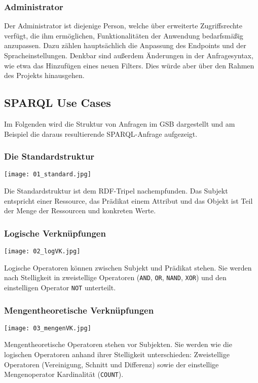 \subsubsection{Administrator}

Der Administrator ist diejenige Person, welche über erweiterte Zugriffsrechte verfügt, die ihm ermöglichen, Funktionalitäten der Anwendung bedarfsmäßig anzupassen.
Dazu zählen hauptsächlich die Anpassung des Endpoints und der Spracheinstellungen. Denkbar sind außerdem Änderungen in der Anfragesyntax, wie etwa das Hinzufügen eines neuen Filters. Dies würde aber über den Rahmen des Projekts hinausgehen.

\subsection{SPARQL Use Cases}
Im Folgenden wird die Struktur von Anfragen im GSB dargestellt und am Beispiel die daraus resultierende SPARQL-Anfrage aufgezeigt.

\subsubsection*{Die Standardstruktur}
\texttt{[image: 01\_standard.jpg]}


Die Standardstruktur ist dem RDF-Tripel nachempfunden. Das Subjekt entspricht einer Ressource, das Prädikat einem Attribut und das Objekt ist Teil der Menge der Ressourcen und konkreten Werte.

\subsubsection*{Logische Verknüpfungen}
\texttt{[image: 02\_logVK.jpg]}


Logische Operatoren können zwischen Subjekt und Prädikat stehen. Sie werden nach Stelligkeit in zweistellige Operatoren (\verb+AND+, \verb+OR+, \verb+NAND+, \verb+XOR+) und den einstelligen Operator \verb+NOT+ unterteilt.

\subsubsection*{Mengentheoretische Verknüpfungen}
\texttt{[image: 03\_mengenVK.jpg]}

Mengentheoretische Operatoren stehen vor Subjekten. Sie werden wie die logischen Operatoren anhand ihrer Stelligkeit unterschieden: Zweistellige Operatoren (Vereinigung, Schnitt und Differenz) sowie der einstellige Mengenoperator Kardinalität (\verb+COUNT+).

